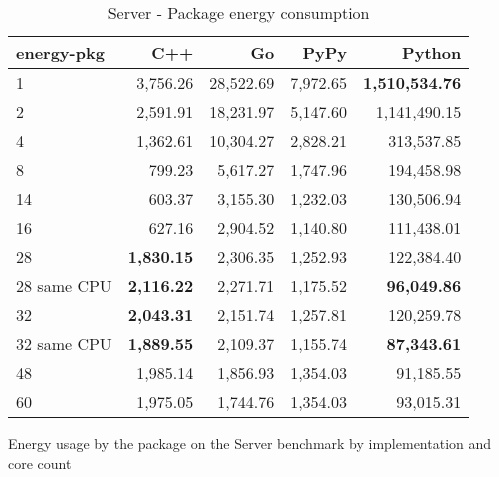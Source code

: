 \begin{table}[H]
    \centering
    \begin{tabular}{lrrrr}
        \hline
        energy-pkg     & C++                & Go         & PyPy       & Python        \\
        \hline
        1              & 3,756.26            & 28,522.69   & 7,972.65   & \textbf{1,510,534.76}  \\
        2              & 2,591.91            & 18,231.97   & 5,147.60   & 1,141,490.15           \\
        4              & 1,362.61            & 10,304.27   & 2,828.21   &   313,537.85           \\
        8	           &   799.23 	         & 5,617.27    & 1,747.96   &	194,458.98           \\ 
        14             &   603.37            & 3,155.30    & 1,232.03   &   130,506.94           \\
        16             &   627.16            & 2,904.52    & 1,140.80   &   111,438.01           \\
        28             & \textbf{1,830.15}   & 2,306.35    & 1,252.93   &   122,384.40           \\
        28 same CPU    & \textbf{2,116.22}   & 2,271.71    & 1,175.52   &   \textbf{96,049.86}   \\
        32             & \textbf{2,043.31}   & 2,151.74    & 1,257.81   &   120,259.78           \\
        32 same CPU    & \textbf{1,889.55}   & 2,109.37    & 1,155.74   &   \textbf{87,343.61}   \\
        48             &   1,985.14          & 1,856.93    & 1,354.03   &    91,185.55           \\
        60             &   1,975.05          & 1,744.76    & 1,354.03   &    93,015.31           \\
        \hline
    \end{tabular}
\caption{Server - Package energy consumption}{Energy usage by the package on the Server benchmark by implementation and core count}
\label{tab:server-energy-pkg}
\end{table}


